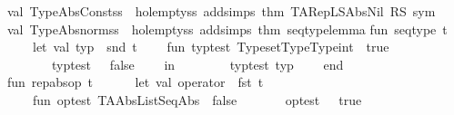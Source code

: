 \begin{isabellebody}
\isanewline
val\ TypeAbs{\isacharunderscore}Const{\isacharunderscore}ss\ {\isacharequal}\ holempty{\isacharunderscore}ss\ addsimps\ {\isacharbrackleft}thm\ {\isachardoublequote}TARep{\isacharunderscore}LSAbs{\isacharunderscore}Nil{\isachardoublequote}\ RS\ sym{\isacharbrackright}\isanewline
\isanewline
val\ TypeAbs{\isacharunderscore}norm{\isacharunderscore}ss\ {\isacharequal}\ holempty{\isacharunderscore}ss\ addsimps\ {\isacharbrackleft}thm\ {\isachardoublequote}seqtype{\isacharunderscore}lemma{\isachardoublequote}{\isacharbrackright}\isanewline
{\isacharverbatimclose}\isanewline
\isanewline
{}\isamarkupfalse%
\isanewline
{\isacharverbatimopen}\isanewline
fun\ seq{\isacharunderscore}type\ t\ {\isacharequal}\ \isanewline
\ \ \ \ let\ val\ typ\ {\isacharequal}\ {\isacharparenleft}snd\ t{\isacharparenright}\isanewline
\ \ \ \ fun\ typ{\isacharunderscore}test\ {\isacharparenleft}Type{\isacharparenleft}{\isachardoublequote}set{\isachardoublequote}{\isacharcomma}{\isacharbrackleft}{\isacharparenleft}Type{\isacharparenleft}{\isachardoublequote}{\isacharasterisk}{\isachardoublequote}{\isacharcomma}{\isacharbrackleft}{\isacharparenleft}Type{\isacharparenleft}{\isachardoublequote}int{\isachardoublequote}{\isacharcomma}{\isacharbrackleft}{\isacharbrackright}{\isacharparenright}{\isacharparenright}{\isacharcomma}{\isacharunderscore}{\isacharbrackright}{\isacharparenright}{\isacharparenright}{\isacharbrackright}{\isacharparenright}{\isacharparenright}\ {\isacharequal}\ true\isanewline
\ \ \ \ \ {\isacharbar}\ \ typ{\isacharunderscore}test\ {\isacharparenleft}{\isacharunderscore}{\isacharparenright}\ {\isacharequal}\ false\isanewline
\ \ \ \ in\isanewline
\ \ \ \ \ \ \ \ typ{\isacharunderscore}test\ {\isacharparenleft}typ{\isacharparenright}\isanewline
\ \ \ \ end\isanewline
\ {\isacharverbatimclose}\isanewline
{}\isamarkupfalse%
\ \isanewline
{\isacharverbatimopen}\ \ \ \isanewline
fun\ rep{\isacharunderscore}abs{\isacharunderscore}op\ t\ {\isacharequal}\ \isanewline
\ \ \ \ let\ val\ operator\ {\isacharequal}\ {\isacharparenleft}fst\ t{\isacharparenright}\isanewline
\ \ \ \ fun\ op{\isacharunderscore}test\ {\isacharparenleft}{\isacharparenleft}{\isachardoublequote}TAAbs{\isachardoublequote}{\isacharcomma}{\isacharunderscore}{\isacharparenright}{\isacharcomma}{\isacharparenleft}{\isachardoublequote}ListSeqAbs{\isachardoublequote}{\isacharcomma}{\isacharunderscore}{\isacharparenright}{\isacharparenright}\ {\isacharequal}\ false\isanewline
\ \ \ \ \ \ {\isacharbar}\ op{\isacharunderscore}test\ {\isacharparenleft}{\isacharunderscore}{\isacharparenright}\ {\isacharequal}\ true\isanewline

\end{isabellebody}
